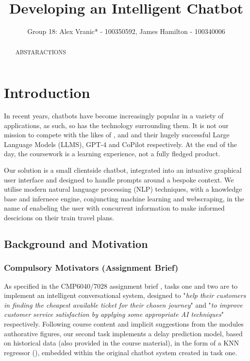 \documentclass[11pt]{article}
\title{Developing an Intelligent Chatbot}
\author{Group 18: Alex Vranic* - 100350592, James Hamilton - 100340006}
\begin{document}
\maketitle


\begin{abstract}
    ABSTARACTIONS

\end{abstract}


\section{Introduction}

In recent years, chatbots have become increasingly popular in a variety of applications, as such, so has the technology surrounding them. It is not our mission to compete with the likes of \cite{openai}, \cite{microsoft} and \cite{github} and their hugely successful Large Language Models (LLMS), GPT-4 \cite{gpt4} and CoPilot \cite{copilot} respectively. At the end of the day, the coursework is a learning experience, not a fully fledged product.

Our solution is a small clientside chatbot, integrated into an intuative graphical user interface and designed to handle prompts around a bespoke context. We utilise modern natural language processing (NLP) techniques, with a knowledge base and infernece engine, conjuncting machine learning and webscraping, in the name of enabeling the user with concurrent information to make informed descicions on their train travel plans.


\subsection{Background and Motivation}

\subsubsection{Compulsory Motivators (Assignment Brief)}

As specified in the CMP6040/7028 assignment brief \cite{AI2018CW}, tasks one and two are to implement an intelligent conversational system, designed to "\textit{help their customers in finding the cheapest available ticket for their chosen journey}" and "\textit{to improve customer service satisfaction by applying some appropriate AI techniques}" respectively. Following course content and implicit suggestions from the modules authorative figures, our second task implements a delay prediction model, based on historical data (also provided in the course material), in the form of a KNN regressor (\cite{knn}), embedded within the original chatbot system created in task one.
\end{document}
